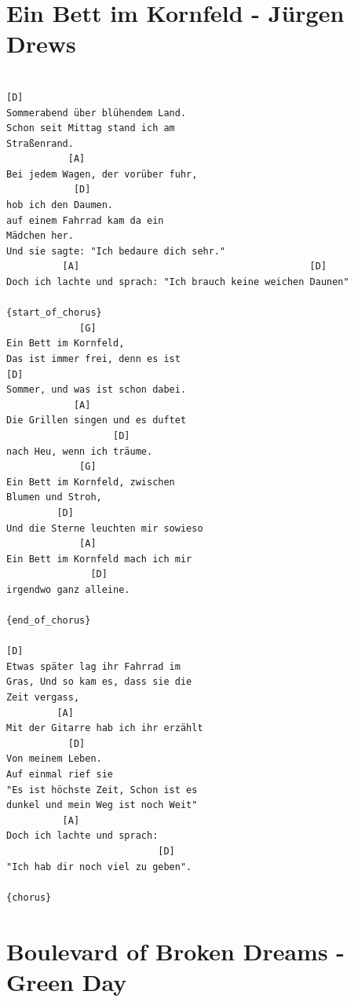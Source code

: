 \documentclass[]{book}
\let\stdsection\section
\renewcommand\section{\clearpage\stdsection}
\begin{document}
\hypertarget{ein-bett-im-kornfeld---jurgen-drews}{%
\section{Ein Bett im Kornfeld - Jürgen Drews}\label{ein-bett-im-kornfeld---jurgen-drews}}

\begin{verbatim}

[D]
Sommerabend über blühendem Land.
Schon seit Mittag stand ich am 
Straßenrand.
           [A]
Bei jedem Wagen, der vorüber fuhr,
            [D]
hob ich den Daumen.
auf einem Fahrrad kam da ein 
Mädchen her.
Und sie sagte: "Ich bedaure dich sehr."
          [A]                                         [D]
Doch ich lachte und sprach: "Ich brauch keine weichen Daunen"

{start_of_chorus}
             [G]
Ein Bett im Kornfeld,
Das ist immer frei, denn es ist
[D]
Sommer, und was ist schon dabei.
            [A]
Die Grillen singen und es duftet 
                   [D]
nach Heu, wenn ich träume.
             [G]
Ein Bett im Kornfeld, zwischen 
Blumen und Stroh,
         [D]
Und die Sterne leuchten mir sowieso
             [A]
Ein Bett im Kornfeld mach ich mir 
               [D]
irgendwo ganz alleine.

{end_of_chorus}

[D]
Etwas später lag ihr Fahrrad im 
Gras, Und so kam es, dass sie die 
Zeit vergass,
         [A]
Mit der Gitarre hab ich ihr erzählt
           [D]
Von meinem Leben.
Auf einmal rief sie
"Es ist höchste Zeit, Schon ist es 
dunkel und mein Weg ist noch Weit"
          [A]
Doch ich lachte und sprach:
                           [D]
"Ich hab dir noch viel zu geben".

{chorus}

\end{verbatim}

\hypertarget{boulevard-of-broken-dreams---green-day}{%
\section{Boulevard of Broken Dreams - Green Day}\label{boulevard-of-broken-dreams---green-day}}
\end{document}
